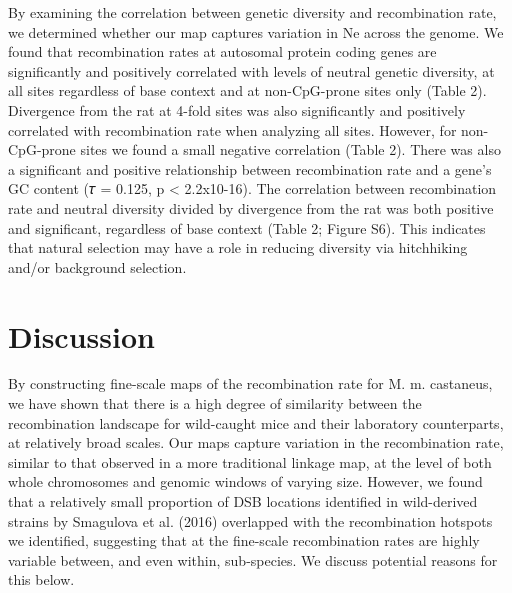 	By examining the correlation between genetic diversity and recombination rate, we determined whether our map captures variation in Ne across the genome. We found that recombination rates at autosomal protein coding genes are significantly and positively correlated with levels of neutral genetic diversity, at all sites regardless of base context and at non-CpG-prone sites only (Table 2). Divergence from the rat at 4-fold sites was also significantly and positively correlated with recombination rate when analyzing all sites. However, for non-CpG-prone sites we found a small negative correlation (Table 2). There was also a significant and positive relationship between recombination rate and a gene’s GC content (𝜏 = 0.125, p < 2.2x10-16). The correlation between recombination rate and neutral diversity divided by divergence from the rat was both positive and significant, regardless of base context (Table 2; Figure S6). This indicates that natural selection may have a role in reducing diversity via hitchhiking and/or background selection.

\section{Discussion}
 
        	By constructing fine-scale maps of the recombination rate for M. m. castaneus, we have shown that there is a high degree of similarity between the recombination landscape for wild-caught mice and their laboratory counterparts, at relatively broad scales. Our maps capture variation in the recombination rate, similar to that observed in a more traditional linkage map, at the level of both whole chromosomes and genomic windows of varying size. However, we found that a relatively small proportion of DSB locations identified in wild-derived strains by Smagulova et al. (2016) overlapped with the recombination hotspots we identified, suggesting that at the fine-scale recombination rates are highly variable between, and even within, sub-species. We discuss potential reasons for this below.
 
